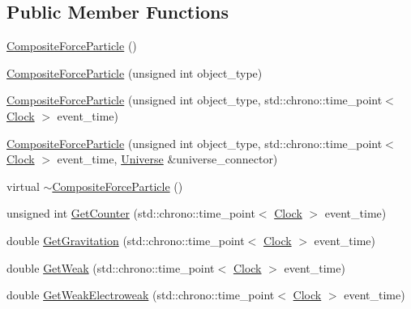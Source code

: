 \subsection*{Public Member Functions}
\begin{DoxyCompactItemize}
\item 
\mbox{\hyperlink{classCompositeForceParticle_ae00ad8621af6155c86ee3205c1e2afdb}{Composite\+Force\+Particle}} ()
\item 
\mbox{\hyperlink{classCompositeForceParticle_a967036ded4212fcd6d4213275145dc50}{Composite\+Force\+Particle}} (unsigned int object\+\_\+type)
\item 
\mbox{\hyperlink{classCompositeForceParticle_a805886058bba3179de8142fd266883e4}{Composite\+Force\+Particle}} (unsigned int object\+\_\+type, std\+::chrono\+::time\+\_\+point$<$ \mbox{\hyperlink{universe_8h_a0ef8d951d1ca5ab3cfaf7ab4c7a6fd80}{Clock}} $>$ event\+\_\+time)
\item 
\mbox{\hyperlink{classCompositeForceParticle_a8c311b3e35f6def3a532346a50c15281}{Composite\+Force\+Particle}} (unsigned int object\+\_\+type, std\+::chrono\+::time\+\_\+point$<$ \mbox{\hyperlink{universe_8h_a0ef8d951d1ca5ab3cfaf7ab4c7a6fd80}{Clock}} $>$ event\+\_\+time, \mbox{\hyperlink{classUniverse}{Universe}} \&universe\+\_\+connector)
\item 
virtual \mbox{\hyperlink{classCompositeForceParticle_aa35ee4244375b2bcc5dd775de30aa39e}{$\sim$\+Composite\+Force\+Particle}} ()
\item 
unsigned int \mbox{\hyperlink{classCompositeForceParticle_ae0bc57309f04b784b2c23b82db869b25}{Get\+Counter}} (std\+::chrono\+::time\+\_\+point$<$ \mbox{\hyperlink{universe_8h_a0ef8d951d1ca5ab3cfaf7ab4c7a6fd80}{Clock}} $>$ event\+\_\+time)
\item 
double \mbox{\hyperlink{classCompositeForceParticle_a06483dc73c156679f34acf85aa5f924e}{Get\+Gravitation}} (std\+::chrono\+::time\+\_\+point$<$ \mbox{\hyperlink{universe_8h_a0ef8d951d1ca5ab3cfaf7ab4c7a6fd80}{Clock}} $>$ event\+\_\+time)
\item 
double \mbox{\hyperlink{classCompositeForceParticle_ab5cc0893a4063cc353ea5d2404f27b0b}{Get\+Weak}} (std\+::chrono\+::time\+\_\+point$<$ \mbox{\hyperlink{universe_8h_a0ef8d951d1ca5ab3cfaf7ab4c7a6fd80}{Clock}} $>$ event\+\_\+time)
\item 
double \mbox{\hyperlink{classCompositeForceParticle_a27762218af4e3c021c89ff4792d81b41}{Get\+Weak\+Electroweak}} (std\+::chrono\+::time\+\_\+point$<$ \mbox{\hyperlink{universe_8h_a0ef8d951d1ca5ab3cfaf7ab4c7a6fd80}{Clock}} $>$ event\+\_\+time)

\end{DoxyCompactItemize}
